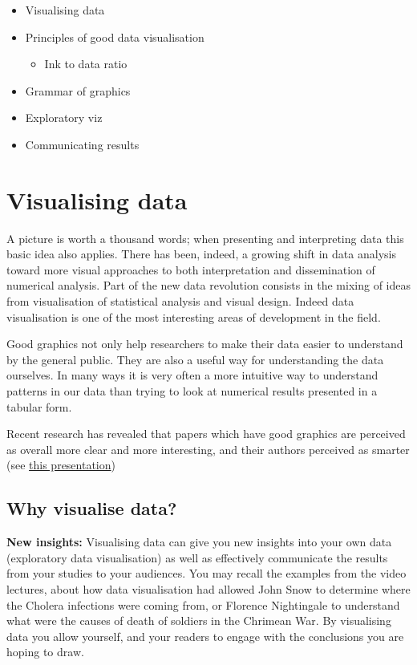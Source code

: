 \documentclass[
]{book}
\providecommand{\tightlist}{%
  \setlength{\itemsep}{0pt}\setlength{\parskip}{0pt}}
\begin{document}
\begin{itemize}
\tightlist
\item
  Visualising data
\item
  Principles of good data visualisation

  \begin{itemize}
  \tightlist
  \item
    Ink to data ratio
  \end{itemize}
\item
  Grammar of graphics
\item
  Exploratory viz
\item
  Communicating results
\end{itemize}

\hypertarget{visualising-data}{%
\section{Visualising data}\label{visualising-data}}

A picture is worth a thousand words; when presenting and interpreting data this basic idea also applies. There has been, indeed, a growing shift in data analysis toward more visual approaches to both interpretation and dissemination of numerical analysis. Part of the new data revolution consists in the mixing of ideas from visualisation of statistical analysis and visual design. Indeed data visualisation is one of the most interesting areas of development in the field.

Good graphics not only help researchers to make their data easier to understand by the general public. They are also a useful way for understanding the data ourselves. In many ways it is very often a more intuitive way to understand patterns in our data than trying to look at numerical results presented in a tabular form.

Recent research has revealed that papers which have good graphics are perceived as overall more clear and more interesting, and their authors perceived as smarter (see \href{https://vimeo.com/181771433}{this presentation})

\hypertarget{why-visualise-data}{%
\subsection{Why visualise data?}\label{why-visualise-data}}

\textbf{New insights:} Visualising data can give you new insights into your own data (exploratory data visualisation) as well as effectively communicate the results from your studies to your audiences. You may recall the examples from the video lectures, about how data visualisation had allowed John Snow to determine where the Cholera infections were coming from, or Florence Nightingale to understand what were the causes of death of soldiers in the Chrimean War. By visualising data you allow yourself, and your readers to engage with the conclusions you are hoping to draw.
\end{document}
